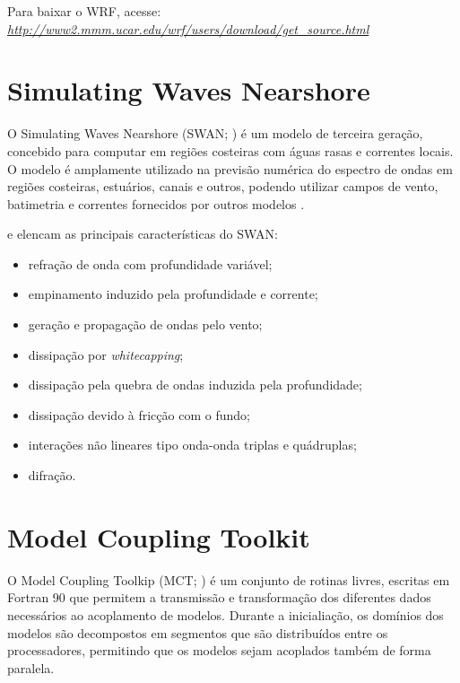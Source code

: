 \noindent Para baixar o WRF, acesse: \textcolor{bleu_cite}{\href{http://www2.mmm.ucar.edu/wrf/users/download/get\_source.html}{\textit{http://www2.mmm.ucar.edu/wrf/users/download/get\_source.html}}}
\bigskip


\section{Simulating Waves Nearshore}\label{swansecao}
\bigskip

\noindent O Simulating Waves Nearshore (SWAN; \cite{Booij1999,Booij1996}) é um modelo de terceira geração, 
          concebido para computar em regiões costeiras com águas rasas e correntes locais. O modelo é amplamente utilizado na previsão numérica do 
          espectro de ondas em regiões costeiras, estuários, canais e outros, podendo utilizar campos de vento, batimetria e 
          correntes fornecidos por outros modelos \parencite{Booij1999,Booij1996}.
\bigskip

\noindent \textcite{Dasilva2013} e \textcite{Booij1999,Booij1996} elencam as principais características do SWAN:
\bigskip

\begin{itemize}
\item refração de onda com profundidade variável;
\item empinamento induzido pela profundidade e corrente;
\item geração e propagação de ondas pelo vento;
\item dissipação por \textit{whitecapping};
\item dissipação pela quebra de ondas induzida pela profundidade;
\item dissipação devido à fricção com o fundo;
\item interações não lineares tipo onda-onda triplas e quádruplas;
\item difração.
\end{itemize}
\bigskip

\section{Model Coupling Toolkit}\label{mctsecao}
\bigskip

\noindent O Model Coupling Toolkip (MCT; \cite{Larson2005,Jacob2005,Warner2008}) é um conjunto de rotinas livres, 
          escritas em Fortran 90 que permitem a transmissão e transformação dos diferentes dados necessários ao acoplamento
          de modelos. Durante a inicialiação, os domínios dos modelos são decompostos em segmentos que são distribuídos
          entre os processadores, permitindo que os modelos sejam acoplados também de forma paralela.
\bigskip

